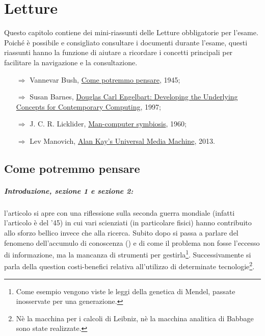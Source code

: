 \chapter{Letture}

Questo capitolo contiene dei mini-riassunti delle Letture
obbligatorie per l'esame. Poiché è possibile e consigliato consultare
i documenti durante l'esame, questi riassunti hanno la funzione di 
aiutare a ricordare i concetti principali per facilitare la navigazione 
e la consultazione.

\begin{itemize}
    \item [$\Rightarrow$] Vannevar Bush, \href{https://informatica.i-learn.unito.it/pluginfile.php/368484/mod_resource/content/7/Bush%20%281945%29.pdf}{Come potremmo pensare}, 1945;
    \item [$\Rightarrow$] Susan Barnes, \href{https://informatica.i-learn.unito.it/pluginfile.php/368474/mod_resource/content/2/Barnes%2C%20S.B.%20--%20Douglas%20Carl%20Engelbart-%20developing%20the%20underlying%20concepts%20for%20contemporary%20computing.pdf}{Douglas Carl Engelbart: Developing the Underlying Concepts for Contemporary Computing}, 1997;
    \item [$\Rightarrow$] J. C. R. Licklider, \href{https://informatica.i-learn.unito.it/pluginfile.php/368452/mod_resource/content/2/Licklider%20-%20Man-Computer%20Symbiosis.pdf}{Man-computer symbiosis}, 1960;
    \item [$\Rightarrow$] Lev Manovich, \href{https://informatica.i-learn.unito.it/pluginfile.php/368438/mod_resource/content/1/Lev%20Manovich-Software_Takes_Command-Ch1.pdf}{Alan Kay's Universal Media Machine}, 2013.
\end{itemize}

\section{Come potremmo pensare}

\paragraph{Introduzione, sezione 1 e sezione 2:} l'articolo si apre con una riflessione sulla seconda guerra mondiale (infatti l'articolo è del '45)
in cui vari scienziati (in particolare fisici) hanno contribuito allo sforzo bellico invece che alla ricerca.
Subito dopo si passa a parlare del fenomeno dell'accumulo di conoscenza () e
di come il problema non fosse l'eccesso di informazione, ma la mancanza di strumenti per gestirla\footnote{
    Come esempio vengono viste le leggi della genetica di Mendel, passate inosservate per una generazione.
}.
Successivamente si parla della question costi-benefici relativa all'utilizzo di determinate tecnologie\footnote{
    Nè la macchina per i calcoli di Leibniz, nè la macchina analitica di Babbage sono state realizzate.
}.

